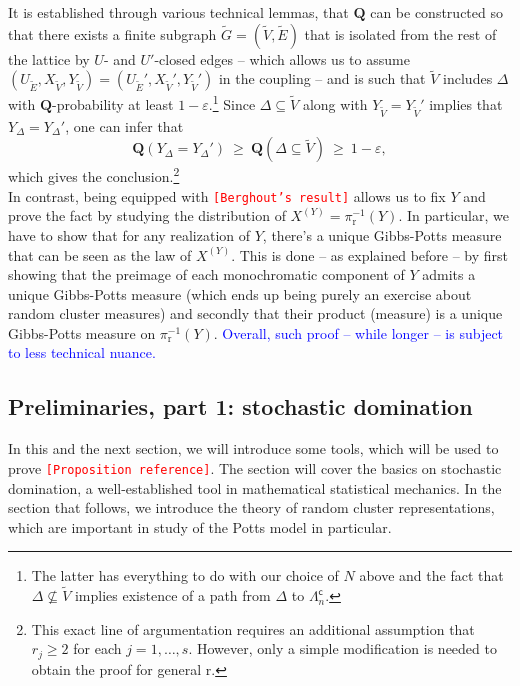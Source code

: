\documentclass[12pt]{article}
\newcommand{\Q}{\mathbf{Q}}
\renewcommand{\r}{\mathrm{r}}
\newcommand{\1}{\mathbbm{1}}
\renewcommand{\c}{\mathsf{c}}
\newcommand{\5}{\vspace{0.5cm}}
\renewcommand{\tilde}{\widetilde}
\theoremstyle{definition}
\begin{document}
It is established through various technical lemmas, that $\Q$ can be constructed so that there exists a finite subgraph $\tilde{G}=(\tilde{V},\tilde{E})$ that is isolated from the rest of the lattice by $U$- and $U'$-closed edges -- which allows us to assume $(U_{\tilde{E}},X_{\tilde{V}},Y_{\tilde{V}})=(U_{\tilde{E}}',X_{\tilde{V}}',Y_{\tilde{V}}')$ in the coupling -- and is such that $\tilde{V}$ includes $\Delta$ with $\Q$-probability at least $1-\varepsilon$.\footnote{The latter has everything to do with our choice of $N$ above and the fact that $\Delta\not\subseteq\tilde{V}$ implies existence of a path from $\Delta$ to $\Lambda_n^\c$.} Since $\Delta\subseteq\tilde{V}$ along with $Y_{\tilde{V}}=Y_{\tilde{V}}'$ implies that $Y_{\Delta}=Y_{\Delta}'$, one can infer that 
$$\Q(Y_{\Delta}=Y_{\Delta}') ~\geq~ \Q(\Delta\subseteq\tilde{V}) ~\geq~ 1-\varepsilon,$$
which gives the conclusion.\footnote{This exact line of argumentation requires an additional assumption that $r_j\geq 2$ for each $j=1,\ldots,s$. However, only a simple modification is needed to obtain the proof for general $\r$.} \\

In contrast, being equipped with \textcolor{red}{\texttt{[Berghout's result]}} allows us to fix $Y$ and prove the fact by studying the distribution of $X^{(Y)}=\pi_\r^{-1}(Y)$. In particular, we have to show that for any realization of $Y$, there's a unique Gibbs-Potts measure that can be seen as the law of $X^{(Y)}$. This is done -- as explained before -- by first showing that the preimage of each monochromatic component of $Y$ admits a unique Gibbs-Potts measure (which ends up being purely an exercise about random cluster measures) and secondly that their product (measure) is a unique Gibbs-Potts measure on $\pi_\r^{-1}(Y)$. \textcolor{blue}{Overall, such proof -- while longer -- is subject to less technical nuance.}


\subsection{Preliminaries, part 1: stochastic domination}

In this and the next section, we will introduce some tools, which will be used to prove \textcolor{red}{\texttt{[Proposition reference]}}. The section will cover the basics on stochastic domination, a well-established tool in mathematical statistical mechanics. In the section that follows, we introduce the theory of random cluster representations, which are important in study of the Potts model in particular. \\
\end{document}
